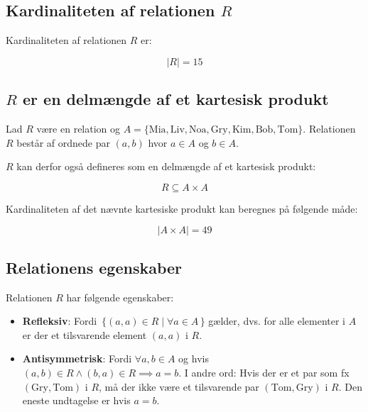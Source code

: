 \subsection{Kardinaliteten af relationen \(R\)}\label{subsec:kardinaliteten-af-relationen-(r)}

Kardinaliteten af relationen \(R\) er:

\begin{equation}
    |R| = 15\label{eq:equation5}
\end{equation}

\subsection{\(R\) er en delmængde af et kartesisk produkt}\label{subsec:(r)-er-en-delmngde-af-et-kartesisk-produkt}

Lad \(R\) være en relation og \(A = \{\text{Mia}, \text{Liv}, \text{Noa}, \text{Gry}, \text{Kim}, \text{Bob},
\text{Tom}\}\).
Relationen \(R\) består af ordnede par \((a, b)\) hvor \(a \in A\) og \(b \in A\).

\(R\) kan derfor også defineres som en delmængde af et kartesisk produkt:

\begin{equation}
    R \subseteq A \times A\label{eq:equation3}
\end{equation}

Kardinaliteten af det nævnte kartesiske produkt kan beregnes på følgende måde:

\begin{equation}
    | A \times A | = 49\label{eq:equation4}
\end{equation}

\subsection{Relationens egenskaber}\label{subsec:relationens-egenskaber}

Relationen \(R\) har følgende egenskaber:

\begin{itemize}
    \item \textbf{Refleksiv}: Fordi \(\,\{(a, a) \in R \mid \forall a \in A\,\}\) gælder, dvs.
          for alle elementer i \(A\) er der et tilsvarende element \((a, a)\) i \(R\).
    \item \textbf{Antisymmetrisk}: Fordi \(\forall a, b \in A \) og hvis
          \((a, b) \in R \land (b, a) \in R \implies a = b\).
          I andre ord: Hvis der er et par som fx \((\text{Gry}, \text{Tom})\) i \(R\), må der ikke være et tilsvarende par
          \((\text{Tom}, \text{Gry})\) i \(R\).
          Den eneste undtagelse er hvis \(a = b\).
\end{itemize}

